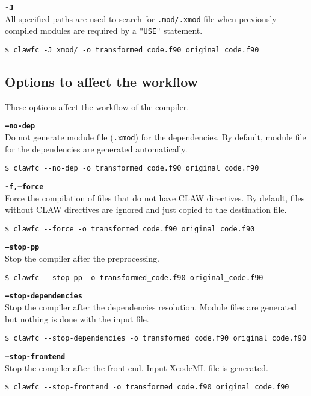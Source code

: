 \documentclass{article}
\begin{document}
\textbf{\texttt{-J}}\\
All specified paths are used to search for \texttt{.mod/.xmod} file when previously compiled modules are required by a \texttt{"USE"} statement.
\begin{lstlisting}
$ clawfc -J xmod/ -o transformed_code.f90 original_code.f90
\end{lstlisting}

\subsection{Options to affect the workflow}
These options affect the workflow of the compiler. 

\textbf{\texttt{--no-dep}}\\
Do not generate module file (\texttt{.xmod}) for the dependencies. By default, module file for the dependencies are generated automatically. 
\begin{lstlisting}
$ clawfc --no-dep -o transformed_code.f90 original_code.f90
\end{lstlisting}

\textbf{\texttt{-f,--force}}\\
Force the compilation of files that do not have CLAW directives. By default, files without CLAW directives are ignored and just copied to the destination file. 
\begin{lstlisting}
$ clawfc --force -o transformed_code.f90 original_code.f90
\end{lstlisting}

\textbf{\texttt{--stop-pp}}\\
Stop the compiler after the preprocessing.
\begin{lstlisting}
$ clawfc --stop-pp -o transformed_code.f90 original_code.f90
\end{lstlisting}

\textbf{\texttt{--stop-dependencies}}\\
Stop the compiler after the dependencies resolution. Module files are generated but nothing is done with the input file. 
\begin{lstlisting}
$ clawfc --stop-dependencies -o transformed_code.f90 original_code.f90
\end{lstlisting}

\textbf{\texttt{--stop-frontend}}\\
Stop the compiler after the front-end. Input XcodeML file is generated. 
\begin{lstlisting}
$ clawfc --stop-frontend -o transformed_code.f90 original_code.f90
\end{lstlisting}
\end{document}
